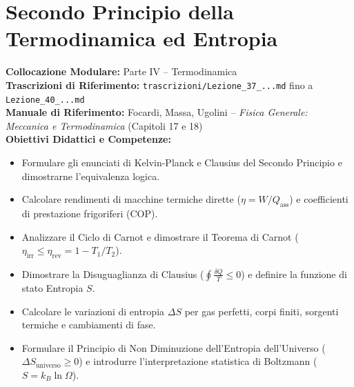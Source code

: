 \chapter{Secondo Principio della Termodinamica ed Entropia}
\label{chap:secondo_principio_entropia}

\begin{tcolorbox}[enhanced, breakable, colback=navyblue!4!white, colframe=navyblue!80!black,
    coltitle=white, fonttitle=\bfseries\sffamily, title={Quadro Sinottico del Capitolo 15 (Corrispondenza: Lezioni 37, 38, 39 e 40)},
    sharp corners, rounded corners=south, boxrule=1pt]
\textbf{Collocazione Modulare:} Parte IV -- Termodinamica\\
\textbf{Trascrizioni di Riferimento:} \texttt{trascrizioni/Lezione\_37\_...md} fino a \texttt{Lezione\_40\_...md}\\
\textbf{Manuale di Riferimento:} Focardi, Massa, Ugolini -- \emph{Fisica Generale: Meccanica e Termodinamica} (Capitoli 17 e 18)\\
\textbf{Obiettivi Didattici e Competenze:}\par
\begin{itemize}
    \item Formulare gli enunciati di Kelvin-Planck e Clausius del Secondo Principio e dimostrarne l'equivalenza logica.
    \item Calcolare rendimenti di macchine termiche dirette ($\eta = W/Q_{\text{ass}}$) e coefficienti di prestazione frigoriferi ($\text{COP}$).
    \item Analizzare il Ciclo di Carnot e dimostrare il Teorema di Carnot ($\eta_{\text{irr}} \le \eta_{\text{rev}} = 1 - T_1/T_2$).
    \item Dimostrare la Disuguaglianza di Clausius ($\oint \frac{\delta Q}{T} \le 0$) e definire la funzione di stato Entropia $S$.
    \item Calcolare le variazioni di entropia $\Delta S$ per gas perfetti, corpi finiti, sorgenti termiche e cambiamenti di fase.
    \item Formulare il Principio di Non Diminuzione dell'Entropia dell'Universo ($\Delta S_{\text{universo}} \ge 0$) e introdurre l'interpretazione statistica di Boltzmann ($S = k_B \ln\Omega$).
\end{itemize}
\end{tcolorbox}


